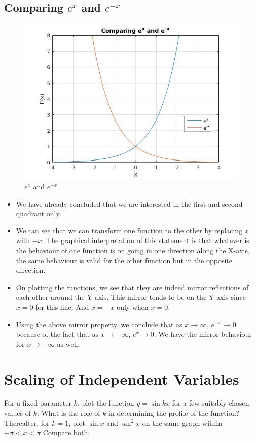 \documentclass{article}
\begin{document}
\subsection{Comparing $e^x$ and $e^{-x}$}
\begin{figure}[!h]
    \centering
    \includegraphics[scale = 0.4]{4}
    \caption{$e^x$ and $e^{-x}$}
    \label{fig:e+-x}
\end{figure}
\begin{itemize}
    \item We have already concluded that we are interested in the first and second quadrant only. 
    \item We can see that we can transform one function to the other by replacing $x$ with $-x$. The graphical interpretation of this statement is that whatever is the behaviour of one function is on going in one direction along the X-axis, the same behaviour is valid for the other function but in the opposite direction.
    \item On plotting the functions, we see that they are indeed mirror reflections of each other around the Y-axis. This mirror tends to be on the Y-axis since $x = 0$ for this line. And $x = -x$ only when $x = 0$.
    \item Using the above mirror property, we conclude that as $x \to \infty$, $e^{-x} \to 0$ because of the fact that as $x \to -\infty$, $e^x \to 0$. We have the mirror behaviour for $x \to -\infty$ as well.
\end{itemize}

\newpage
\section{Scaling of Independent Variables}
For a fixed parameter $k$, plot the function $y = \sin{kx}$ for a few suitably chosen values of $k$. What is the role of $k$ in determining the profile of the function? Thereafter, for $k = 1$, plot $\sin{x}$ and $\sin^{2}{x}$ on the same graph within $-\pi < x < \pi$ Compare both.
\end{document}
